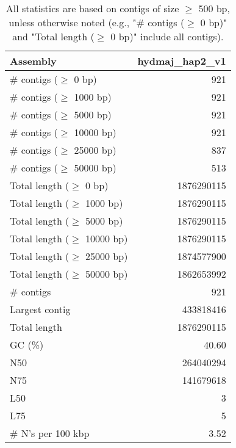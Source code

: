 \documentclass[12pt,a4paper]{article}
\begin{document}
\begin{table}[ht]
\begin{center}
\caption{All statistics are based on contigs of size $\geq$ 500 bp, unless otherwise noted (e.g., "\# contigs ($\geq$ 0 bp)" and "Total length ($\geq$ 0 bp)" include all contigs).}
\begin{tabular}{|l*{1}{|r}|}
\hline
Assembly & hydmaj\_hap2\_v1 \\ \hline
\# contigs ($\geq$ 0 bp) & 921 \\ \hline
\# contigs ($\geq$ 1000 bp) & 921 \\ \hline
\# contigs ($\geq$ 5000 bp) & 921 \\ \hline
\# contigs ($\geq$ 10000 bp) & 921 \\ \hline
\# contigs ($\geq$ 25000 bp) & 837 \\ \hline
\# contigs ($\geq$ 50000 bp) & 513 \\ \hline
Total length ($\geq$ 0 bp) & 1876290115 \\ \hline
Total length ($\geq$ 1000 bp) & 1876290115 \\ \hline
Total length ($\geq$ 5000 bp) & 1876290115 \\ \hline
Total length ($\geq$ 10000 bp) & 1876290115 \\ \hline
Total length ($\geq$ 25000 bp) & 1874577900 \\ \hline
Total length ($\geq$ 50000 bp) & 1862653992 \\ \hline
\# contigs & 921 \\ \hline
Largest contig & 433818416 \\ \hline
Total length & 1876290115 \\ \hline
GC (\%) & 40.60 \\ \hline
N50 & 264040294 \\ \hline
N75 & 141679618 \\ \hline
L50 & 3 \\ \hline
L75 & 5 \\ \hline
\# N's per 100 kbp & 3.52 \\ \hline
\end{tabular}
\end{center}
\end{table}
\end{document}
